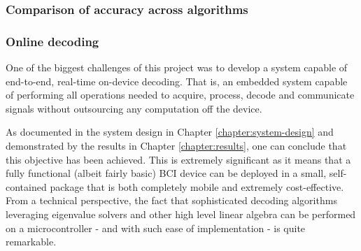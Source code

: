 
\subsubsection{Comparison of accuracy across algorithms}
\label{subsection:algo-comparison-results}

\subsubsection{Online decoding}
One of the biggest challenges of this project was to develop a system capable of end-to-end, real-time on-device decoding. That is, an embedded system capable of performing all operations needed to acquire, process, decode and communicate signals without outsourcing any computation off the device. 

As documented in the system design in Chapter \ref{chapter:system-design} and demonstrated by the results in Chapter \ref{chapter:results}, one can conclude that this objective has been achieved. This is extremely significant as it means that a fully functional (albeit fairly basic) BCI device can be deployed in a small, self-contained package that is both completely mobile and extremely cost-effective. From a technical perspective, the fact that sophisticated decoding algorithms leveraging eigenvalue solvers and other high level linear algebra can be performed on a microcontroller - and with such ease of implementation - is quite remarkable.  

